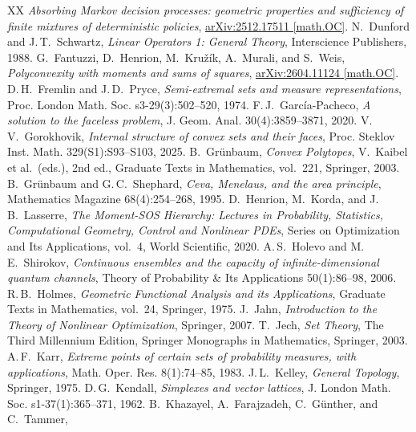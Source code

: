 \documentclass[a4paper,11pt,reqno]{amsart}
\numberwithin{equation}{section}
\theoremstyle{plain}
\theoremstyle{definition}
\begin{document}
\begin{thebibliography}{XX}
\emph{Absorbing Markov decision processes: geometric properties and sufficiency of finite 
mixtures of deterministic policies},
\href{https://arxiv.org/abs/2512.17511}%
{arXiv:2512.17511 [math.OC]}.
%
N.~Dunford and J.\,T.~Schwartz, 
\emph{Linear Operators 1: General Theory},
Interscience Publishers, 1988.
%
G.~Fantuzzi, D.~Henrion, M.~Kru\v{z}\'{i}k, A.~Murali, and S.~Weis,
\emph{Polyconvexity with moments and sums of squares},
\href{https://arxiv.org/abs/2604.11124}%
{arXiv:2604.11124 [math.OC]}.
%
D.\,H.~Fremlin and J.\,D.~Pryce,
\emph{Semi-extremal sets and measure representations},
Proc. London Math. Soc. s3-29(3):502--520, 1974.
%
F.\,J.~Garc{\'i}a-Pacheco,
\emph{A solution to the faceless problem},
J. Geom. Anal. 30(4):3859--3871, 2020.
%
V.\,V.~Gorokhovik, 
\emph{Internal structure of convex sets and their faces},
Proc. Steklov Inst. Math. 329(S1):S93--S103, 2025.
%
B.~Gr{\"u}nbaum, 
\emph{Convex Polytopes}, 
V.~Kaibel et al.\ (eds.),
2nd ed., 
Graduate Texts in Mathematics, vol.~221, 
Springer, 
2003.
%
B.~Gr{\"u}nbaum and G.\,C.~Shephard,
\emph{Ceva, Menelaus, and the area principle},
Mathematics Magazine 68(4):254--268, 1995.
%
D.~Henrion, M.~Korda, and J.\,B.~Lasserre, 
\emph{The Moment-SOS Hierarchy: Lectures in Probability, Statistics, Computational Geometry, Control and Nonlinear PDEs}, 
Series on Optimization and Its Applications, vol.~4, 
World Scientific, 2020.
%
A.\,S.~Holevo and M.\,E.~Shirokov,
\emph{Continuous ensembles and the capacity of infinite-dimensional quantum channels},
Theory of Probability \& Its Applications 50(1):86--98, 2006.
%
R.\,B.~Holmes,
\emph{Geometric Functional Analysis and its Applications},
Graduate Texts in Mathematics, vol.~24,
Springer, 
1975.
%
J.~Jahn, 
\emph{Introduction to the Theory of Nonlinear Optimization},
Springer, 2007.
%
T.~Jech,
\emph{Set Theory}, 
The Third Millennium Edition, 
Springer Monographs in Mathematics, 
Springer, 
2003.
%
A.\,F.~Karr,
\emph{Extreme points of certain sets of probability measures, with applications},
Math. Oper. Res. 8(1):74--85, 1983.
%
J.\,L.~Kelley,
\emph{General Topology}, 
Springer, 1975.
%
D.\,G.~Kendall,
\emph{Simplexes and vector lattices},
J. London Math. Soc. s1-37(1):365--371, 1962.
%
B.~Khazayel, A.~Farajzadeh, C.~G\"{u}nther, and C.~Tammer, 

\end{thebibliography}
\end{document}

